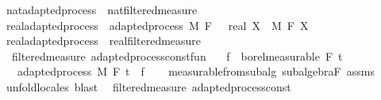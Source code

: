 \begin{isabellebody}
\isamarkupfalse%
\ nat{\isacharunderscore}{\kern0pt}adapted{\isacharunderscore}{\kern0pt}process\ {\isasymsubseteq}\ nat{\isacharunderscore}{\kern0pt}filtered{\isacharunderscore}{\kern0pt}measure%
\isadelimproof
\ %
\endisadelimproof
%
\isatagproof
\isacommand{{\isachardot}{\kern0pt}{\isachardot}{\kern0pt}}\isamarkupfalse%
%
\endisatagproof
{\isafoldproof}%
%
\isadelimproof
%
\endisadelimproof
\isanewline
\isanewline
{}\isamarkupfalse%
\ real{\isacharunderscore}{\kern0pt}adapted{\isacharunderscore}{\kern0pt}process\ {\isacharequal}{\kern0pt}\ adapted{\isacharunderscore}{\kern0pt}process\ M\ F\ {\isachardoublequoteopen}{}\ {\isacharcolon}{\kern0pt}{\isacharcolon}{\kern0pt}\ real{\isachardoublequoteclose}\ X\ \ M\ F\ X\isanewline
{}\isamarkupfalse%
\ real{\isacharunderscore}{\kern0pt}adapted{\isacharunderscore}{\kern0pt}process\ {\isasymsubseteq}\ real{\isacharunderscore}{\kern0pt}filtered{\isacharunderscore}{\kern0pt}measure%
\isadelimproof
\ %
\endisadelimproof
%
\isatagproof
\isacommand{{\isachardot}{\kern0pt}{\isachardot}{\kern0pt}}\isamarkupfalse%
%
\endisatagproof
{\isafoldproof}%
%
\isadelimproof
%
\endisadelimproof
\isanewline
\isanewline
{}\isamarkupfalse%
\ {\isacharparenleft}{\kern0pt}\ filtered{\isacharunderscore}{\kern0pt}measure{\isacharparenright}{\kern0pt}\ adapted{\isacharunderscore}{\kern0pt}process{\isacharunderscore}{\kern0pt}const{\isacharunderscore}{\kern0pt}fun{\isacharcolon}{\kern0pt}\isanewline
\ \ \ {\isachardoublequoteopen}f\ {\isasymin}\ borel{\isacharunderscore}{\kern0pt}measurable\ {\isacharparenleft}{\kern0pt}F\ t\isanewline
\ \ \ {\isachardoublequoteopen}adapted{\isacharunderscore}{\kern0pt}process\ M\ F\ t\ {\isacharparenleft}{\kern0pt}{\isasymlambda}{\isacharunderscore}{\kern0pt}{\isachardot}{\kern0pt}\ f{\isacharparenright}{\kern0pt}{\isachardoublequoteclose}\isanewline
%
\isadelimproof
\ \ %
\endisadelimproof
%
\isatagproof
{}\isamarkupfalse%
\ measurable{\isacharunderscore}{\kern0pt}from{\isacharunderscore}{\kern0pt}subalg\ subalgebra{\isacharunderscore}{\kern0pt}F\ assms\ \isamarkupfalse%
\ {\isacharparenleft}{\kern0pt}unfold{\isacharunderscore}{\kern0pt}locales{\isacharparenright}{\kern0pt}\ blast%
\endisatagproof
{\isafoldproof}%
%
\isadelimproof
\isanewline
%
\endisadelimproof
\isanewline
{}\isamarkupfalse%
\ {\isacharparenleft}{\kern0pt}\ filtered{\isacharunderscore}{\kern0pt}measure{\isacharparenright}{\kern0pt}\ adapted{\isacharunderscore}{\kern0pt}process{\isacharunderscore}{\kern0pt}const{\isacharcolon}{\kern0pt}\isanewline

\end{isabellebody}
